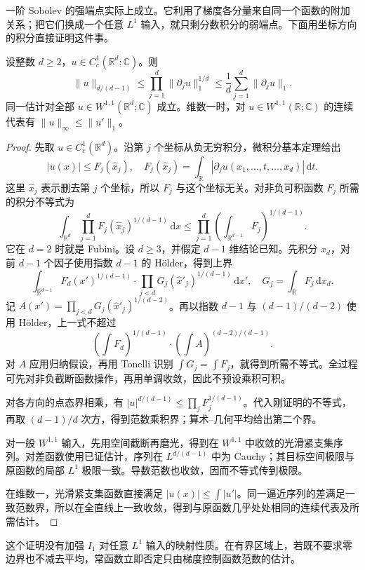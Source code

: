 \ProseParagraphBreak

一阶 Sobolev 的强端点实际上成立。它利用了梯度各分量来自同一个函数的附加关系；把它们换成一个任意 \(L^1\) 输入，就只剩分数积分的弱端点。下面用坐标方向的积分直接证明这件事。
\begin{theorem}\label{b2:thm:19-sobolev-l1}
设整数 \(d\geq2\)，\(u\in C_c^1(\mathbb R^d;\mathbb C)\)。则
\[
 \|u\|_{d/(d-1)}
 \leq\prod_{j=1}^d\|\partial_ju\|_1^{1/d}
 \leq\frac1d\sum_{j=1}^d\|\partial_ju\|_1.
\]
同一估计对全部 \(u\in W^{1,1}(\mathbb R^d;\mathbb C)\) 成立。维数一时，对 \(u\in W^{1,1}(\mathbb R;\mathbb C)\) 的连续代表有 \(\|u\|_\infty\leq\|u'\|_1\)。
\end{theorem}
\begin{proof}
先取 \(u\in C_c^1(\mathbb R^d)\)。沿第 \(j\) 个坐标从负无穷积分，微积分基本定理给出
\[
 |u(x)|\leq F_j(\widehat x_j),
 \quad
 F_j(\widehat x_j)=\int_{\mathbb R}
 |\partial_ju(x_1,\ldots,t,\ldots,x_d)|\,\mathrm dt.
\]
这里 \(\widehat x_j\) 表示删去第 \(j\) 个坐标，所以 \(F_j\) 与这个坐标无关。对非负可积函数 \(F_j\) 所需的积分不等式为
\[
 \int_{\mathbb R^d}\prod_{j=1}^d
          F_j(\widehat x_j)^{1/(d-1)}\,\mathrm dx
 \leq\prod_{j=1}^d
       \left(\int_{\mathbb R^{d-1}}F_j\right)^{1/(d-1)}.
\]
它在 \(d=2\) 时就是 Fubini。设 \(d\geq3\)，并假定 \(d-1\) 维结论已知。先积分 \(x_d\)，对前 \(d-1\) 个因子使用指数 \(d-1\) 的 Hölder，得到上界
\[
 \int_{\mathbb R^{d-1}}F_d(x')^{1/(d-1)}
       \cdot\prod_{j<d}G_j(\widehat x'_j)^{1/(d-1)}\,\mathrm dx',
 \quad G_j=\int_{\mathbb R}F_j\,\mathrm dx_d.
\]
记 \(A(x')=\prod_{j<d}G_j(\widehat x'_j)^{1/(d-2)}\)。再以指数 \(d-1\) 与 \((d-1)/(d-2)\) 使用 Hölder，上一式不超过
\[
 \left(\int F_d\right)^{1/(d-1)}
 \cdot\left(\int A\right)^{(d-2)/(d-1)}.
\]
对 \(A\) 应用归纳假设，再用 Tonelli 识别 \(\int G_j=\int F_j\)，就得到所需不等式。全过程可先对非负截断函数操作，再用单调收敛，因此不预设乘积可积。

对各方向的点态界相乘，有 \(|u|^{d/(d-1)}\leq\prod_jF_j^{1/(d-1)}\)。代入刚证明的不等式，再取 \((d-1)/d\) 次方，得到范数乘积界；算术--几何平均给出第二个界。

对一般 \(W^{1,1}\) 输入，先用空间截断再磨光，得到在 \(W^{1,1}\) 中收敛的光滑紧支集序列。对差函数使用已证估计，序列在 \(L^{d/(d-1)}\) 中为 Cauchy；其目标空间极限与原函数的局部 \(L^1\) 极限一致。导数范数也收敛，因而不等式传到极限。

在维数一，光滑紧支集函数直接满足 \(|u(x)|\leq\int|u'|\)。同一逼近序列的差满足一致范数界，所以在全直线上一致收敛，得到与原函数几乎处处相同的连续代表及所需估计。
\end{proof}
这个证明没有加强 \(I_1\) 对任意 \(L^1\) 输入的映射性质。在有界区域上，若既不要求零边界也不减去平均，常函数立即否定只由梯度控制函数范数的估计。

